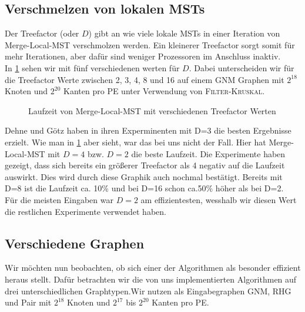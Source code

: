 \subsection{Verschmelzen von lokalen MSTs}\label{eval-treefactor}
Der Treefactor (oder $D$) gibt an wie viele lokale MSTs in einer Iteration von Merge-Local-MST verschmolzen werden. Ein kleinerer Treefactor sorgt somit für mehr Iterationen, aber dafür sind weniger Prozessoren im Anschluss inaktiv.\\
In \cref{Treefactor-Img} sehen wir \mergeMST mit fünf verschiedenen werten für $D$.
Dabei unterscheiden wir für die Treefactor Werte zwischen 2, 3, 4, 8 und 16 auf einem GNM Graphen mit $2^{18}$ Knoten und $2^{20}$ Kanten pro PE unter Verwendung von \textsc{Filter-Kruskal}.


\begin{figure}[H]
    \centering
    
    
    
    \caption{Laufzeit von Merge-Local-MST mit verschiedenen Treefactor Werten}
    \label{Treefactor-Img}
\end{figure}


Dehne und Götz \cite{dehne1998practical} haben in ihren Experminenten mit D=3 die besten Ergebnisse erzielt. 
Wie man in \cref{Treefactor-Img} aber sieht, war das bei uns nicht der Fall. Hier hat Merge-Local-MST mit $D=4$ bzw. $D=2$ die beste Laufzeit. 
Die Experimente haben gezeigt, dass sich bereits ein größerer Treefactor als 4 negativ auf die Laufzeit auswirkt. Dies wird durch diese Graphik auch nochmal bestätigt. Bereits mit D=8 ist die Laufzeit ca. 10\% und bei D=16 schon ca.50\% höher als bei D=2.\\
Für die meisten Eingaben war $D=2$ am effizientesten, wesshalb wir diesen Wert die restlichen Experimente verwendet haben.



\subsection{Verschiedene Graphen}
Wir möchten nun beobachten, ob sich einer der Algorithmen als besonder effizient heraus stellt.
Dafür betrachten wir die von uns implementierten Algorithmen auf drei unterschiedlichen Graphtypen.Wir nutzen als Eingabegraphen GNM, RHG und Pair mit $2^{18}$ Knoten und $2^{17}$ bis $2^{20}$ Kanten pro PE.


